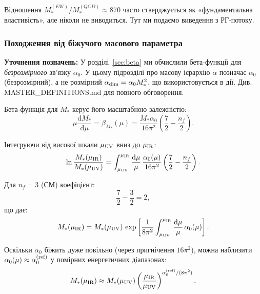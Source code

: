 \documentclass[11pt,a4paper]{article}
\numberwithin{equation}{section}
\theoremstyle{plain}
\theoremstyle{definition}
\theoremstyle{remark}
\newcommand{\dd}{\mathrm{d}}
\begin{document}
Відношення $M_*^{(EW)}/M_*^{(QCD)} \approx 870$ часто стверджується як «фундаментальна властивість», але ніколи не виводиться. Тут ми подаємо виведення з РГ-потоку.

\subsubsection{Походження від біжучого масового параметра}

\textbf{Уточнення позначень:} У розділі~\ref{sec:beta} ми обчислили бета-функції для \emph{безрозмірного} зв'язку $\alpha_0$. У цьому підрозділі про масову ієрархію $\alpha$ позначає $\alpha_0$ (безрозмірний), а не розмірний $\alpha_{\rm dim} = \alpha_0 M_*^2$, що використовується в дії. Див. MASTER\_DEFINITIONS.md для повного обговорення.

Бета-функція для $M_*$ керує його масштабною залежністю:
\begin{equation}
\mu\frac{\dd M_*}{\dd\mu} = \beta_{M_*}(\mu) = \frac{M_*\alpha_0}{16\pi^2}\left(\frac{7}{2} - \frac{n_f}{2}\right).
\label{eq:beta-M-hierarchy}
\end{equation}

Інтегруючи від високої шкали $\mu_{\rm UV}$ вниз до $\mu_{\rm IR}$:
\begin{equation}
\ln\frac{M_*(\mu_{\rm IR})}{M_*(\mu_{\rm UV})} = \int_{\mu_{\rm UV}}^{\mu_{\rm IR}} \frac{\dd\mu}{\mu}\,\frac{\alpha_0(\mu)}{16\pi^2}\left(\frac{7}{2} - \frac{n_f}{2}\right).
\label{eq:M-running-integral}
\end{equation}

Для $n_f=3$ (СМ) коефіцієнт:
\begin{equation}
\frac{7}{2} - \frac{3}{2} = 2,
\label{eq:coeff-M}
\end{equation}
що дає:
\begin{equation}
M_*(\mu_{\rm IR}) = M_*(\mu_{\rm UV})\,\exp\left[\frac{1}{8\pi^2}\int_{\mu_{\rm UV}}^{\mu_{\rm IR}} \frac{\dd\mu}{\mu}\,\alpha_0(\mu)\right].
\label{eq:M-running-solution}
\end{equation}

Оскільки $\alpha_0$ біжить дуже повільно (через пригнічення $16\pi^2$), можна наблизити $\alpha_0(\mu)\approx\alpha_0^{(\rm ref)}$ у помірних енергетичних діапазонах:
\begin{equation}
M_*(\mu_{\rm IR}) \approx M_*(\mu_{\rm UV})\left(\frac{\mu_{\rm IR}}{\mu_{\rm UV}}\right)^{\alpha_0^{(\rm ref)}/(8\pi^2)}.
\label{eq:M-power-law}
\end{equation}
\end{document}
